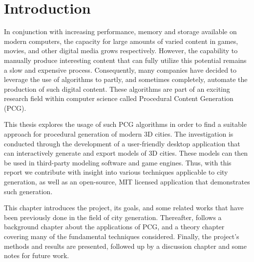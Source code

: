 \chapter{Introduction}



In conjunction with increasing performance, memory and storage available on modern computers, the capacity for large amounts of varied content in games, movies, and other digital media grows respectively.
However, the capability to manually produce interesting content that can fully utilize this potential remains a slow and expensive process.
Consequently, many companies have decided to leverage the use of algorithms to partly, and sometimes completely, automate the production of such digital content.
These algorithms are part of an exciting research field within computer science called Procedural Content Generation (PCG).

This thesis explores the usage of such PCG algorithms in order to find a suitable approach for procedural generation of modern 3D cities.
The investigation is conducted through the development of a user-friendly desktop application that can interactively generate and export models of 3D cities.
These models can then be used in third-party modeling software and game engines.
Thus, with this report we contribute with insight into various techniques applicable to city generation, as well as an open-source, MIT licensed application that demonstrates such generation.

This chapter introduces the project, its goals, and some related works that have been previously done in the field of city generation.
Thereafter, follows a background chapter about the applications of PCG, and a theory chapter covering many of the fundamental techniques considered.
Finally, the project's methods and results are presented, followed up by a discussion chapter and some notes for future work.

\newpage





